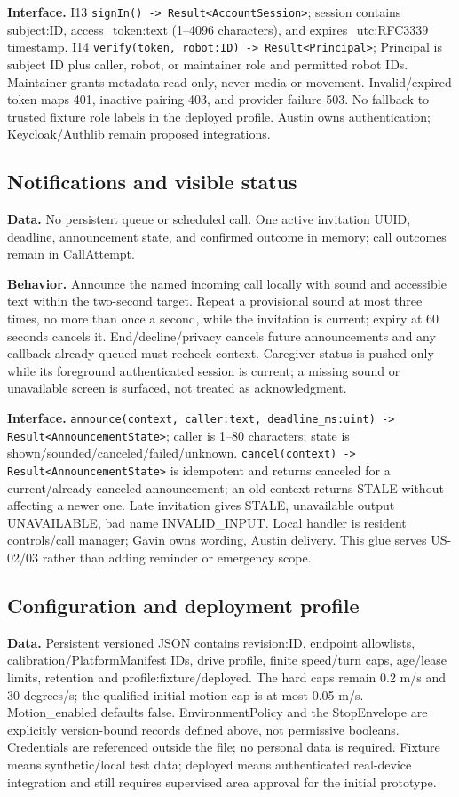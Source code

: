 \documentclass[12pt,letterpaper]{article}
\newcommand{\field}[1]{\texttt{#1}}
\begin{document}
\textbf{Interface.} I13 \field{signIn() -> Result<AccountSession>}; session contains subject:ID, access\_\allowbreak{}token:text (1--4096 characters), and expires\_\allowbreak{}utc:RFC3339 timestamp. I14 \field{verify(token, robot:ID) -> Result<Principal>}; Principal is subject ID plus caller, robot, or maintainer role and permitted robot IDs. Maintainer grants metadata-read only, never media or movement. Invalid/expired token maps 401, inactive pairing 403, and provider failure 503. No fallback to trusted fixture role labels in the deployed profile. Austin owns authentication; Keycloak/Authlib remain proposed integrations.

\subsection*{Notifications and visible status}
\textbf{Data.} No persistent queue or scheduled call. One active invitation UUID, deadline, announcement state, and confirmed outcome in memory; call outcomes remain in CallAttempt.

\textbf{Behavior.} Announce the named incoming call locally with sound and accessible text within the two-second target. Repeat a provisional sound at most three times, no more than once a second, while the invitation is current; expiry at 60 seconds cancels it. End/decline/privacy cancels future announcements and any callback already queued must recheck context. Caregiver status is pushed only while its foreground authenticated session is current; a missing sound or unavailable screen is surfaced, not treated as acknowledgment.

\textbf{Interface.} \field{announce(context, caller:text, deadline\_\allowbreak{}ms:uint) -> Result<AnnouncementState>}; caller is 1--80 characters; state is shown/sounded/canceled/failed/unknown. \field{cancel(context) -> Result<AnnouncementState>} is idempotent and returns canceled for a current/already canceled announcement; an old context returns STALE without affecting a newer one. Late invitation gives STALE, unavailable output UNAVAILABLE, bad name INVALID\_\allowbreak{}INPUT. Local handler is resident controls/call manager; Gavin owns wording, Austin delivery. This glue serves US-02/03 rather than adding reminder or emergency scope.

\subsection*{Configuration and deployment profile}
\textbf{Data.} Persistent versioned JSON contains revision:ID, endpoint allowlists, calibration/PlatformManifest IDs, drive profile, finite speed/turn caps, age/lease limits, retention and profile:fixture/deployed. The hard caps remain 0.2 m/s and 30 degrees/s; the qualified initial motion cap is at most 0.05 m/s. Motion\_\allowbreak{}enabled defaults false. EnvironmentPolicy and the StopEnvelope are explicitly version-bound records defined above, not permissive booleans. Credentials are referenced outside the file; no personal data is required. Fixture means synthetic/local test data; deployed means authenticated real-device integration and still requires supervised area approval for the initial prototype.
\end{document}
